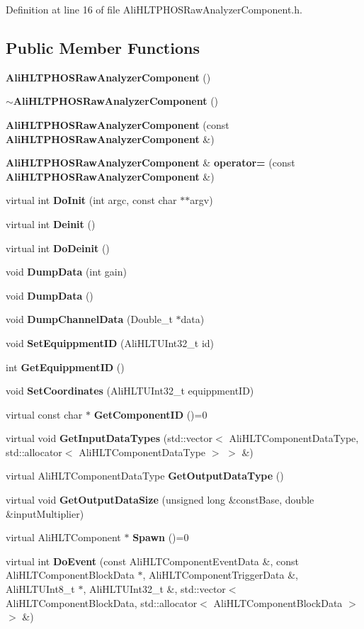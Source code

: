 Definition at line 16 of file Ali\-HLTPHOSRaw\-Analyzer\-Component.h.\subsection*{Public Member Functions}
\begin{CompactItemize}
\item 
{\bf Ali\-HLTPHOSRaw\-Analyzer\-Component} ()
\item 
{\bf $\sim$Ali\-HLTPHOSRaw\-Analyzer\-Component} ()
\item 
{\bf Ali\-HLTPHOSRaw\-Analyzer\-Component} (const {\bf Ali\-HLTPHOSRaw\-Analyzer\-Component} \&)
\item 
{\bf Ali\-HLTPHOSRaw\-Analyzer\-Component} \& {\bf operator=} (const {\bf Ali\-HLTPHOSRaw\-Analyzer\-Component} \&)
\item 
virtual int {\bf Do\-Init} (int argc, const char $\ast$$\ast$argv)
\item 
virtual int {\bf Deinit} ()
\item 
virtual int {\bf Do\-Deinit} ()
\item 
void {\bf Dump\-Data} (int gain)
\item 
void {\bf Dump\-Data} ()
\item 
void {\bf Dump\-Channel\-Data} (Double\_\-t $\ast$data)
\item 
void {\bf Set\-Equippment\-ID} (Ali\-HLTUInt32\_\-t id)
\item 
int {\bf Get\-Equippment\-ID} ()
\item 
void {\bf Set\-Coordinates} (Ali\-HLTUInt32\_\-t equippment\-ID)
\item 
virtual const char $\ast$ {\bf Get\-Component\-ID} ()=0
\item 
virtual void {\bf Get\-Input\-Data\-Types} (std::vector$<$ Ali\-HLTComponent\-Data\-Type, std::allocator$<$ Ali\-HLTComponent\-Data\-Type $>$ $>$ \&)
\item 
virtual Ali\-HLTComponent\-Data\-Type {\bf Get\-Output\-Data\-Type} ()
\item 
virtual void {\bf Get\-Output\-Data\-Size} (unsigned long \&const\-Base, double \&input\-Multiplier)
\item 
virtual Ali\-HLTComponent $\ast$ {\bf Spawn} ()=0
\item 
virtual int {\bf Do\-Event} (const Ali\-HLTComponent\-Event\-Data \&, const Ali\-HLTComponent\-Block\-Data $\ast$, Ali\-HLTComponent\-Trigger\-Data \&, Ali\-HLTUInt8\_\-t $\ast$, Ali\-HLTUInt32\_\-t \&, std::vector$<$ Ali\-HLTComponent\-Block\-Data, std::allocator$<$ Ali\-HLTComponent\-Block\-Data $>$ $>$ \&)
\end{CompactItemize}
